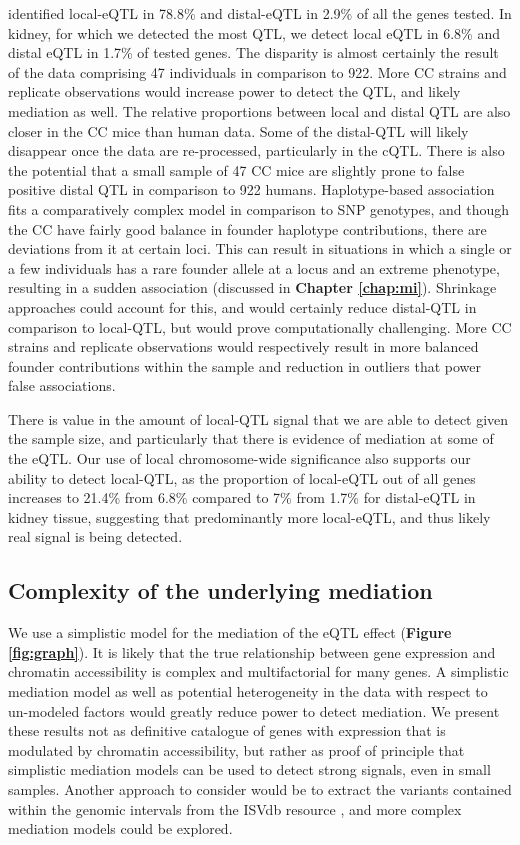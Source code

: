 \cite{Battle2014} identified local-eQTL in 78.8\% and distal-eQTL in 2.9\% of all the genes tested. In kidney, for which we detected the most QTL, we detect local eQTL in 6.8\% and distal eQTL in 1.7\% of tested genes. The disparity is almost certainly the result of the data comprising 47 individuals in comparison to 922. More CC strains and replicate observations would increase power to detect the QTL, and likely mediation as well. The relative proportions between local and distal QTL are also closer in the CC mice than human data. Some of the distal-QTL will likely disappear once the data are re-processed, particularly in the cQTL. There is also the potential that a small sample of 47 CC mice are slightly prone to false positive distal QTL in comparison to 922 humans. Haplotype-based association fits a comparatively complex model in comparison to SNP genotypes, and though the CC have fairly good balance in founder haplotype contributions, there are deviations from it at certain loci. This can result in situations in which a single or a few individuals has a rare founder allele at a locus and an extreme phenotype, resulting in a sudden association (discussed in \textbf{Chapter \ref{chap:mi}}). Shrinkage approaches could account for this, and would certainly reduce distal-QTL in comparison to local-QTL, but would prove computationally challenging. More CC strains and replicate observations would respectively result in more balanced founder contributions within the sample and reduction in outliers that power false associations.

There is value in the amount of local-QTL signal that we are able to detect given the sample size, and particularly that there is evidence of mediation at some of the eQTL. Our use of local chromosome-wide significance also supports our ability to detect local-QTL, as the proportion of local-eQTL out of all genes increases to 21.4\% from 6.8\% compared to 7\% from 1.7\% for distal-eQTL in kidney tissue,  suggesting that predominantly more local-eQTL, and thus likely real signal is being detected.

\subsection{Complexity of the underlying mediation}

We use a simplistic model for the mediation of the eQTL effect (\textbf{Figure \ref{fig:graph}}). It is likely that the true relationship between gene expression and chromatin accessibility is complex and multifactorial for many genes. A simplistic mediation model as well as potential heterogeneity in the data with respect to un-modeled factors would greatly reduce power to detect mediation. We present these results not as definitive catalogue of genes with expression that is modulated by chromatin accessibility, but rather as proof of principle that simplistic mediation models can be used to detect strong signals, even in small samples. Another approach to consider would be to extract the variants contained within the genomic intervals from the ISVdb resource \citep{Oreper2017}, and more complex mediation models could be explored.

